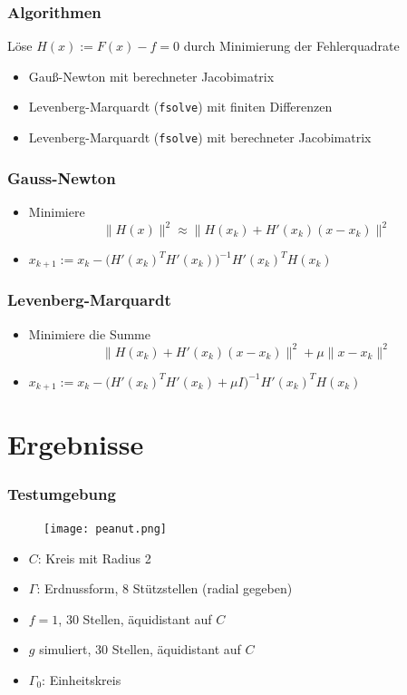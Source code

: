 \documentclass[draft]{beamer}
\begin{document}
\begin{frame}
	\frametitle{Algorithmen}
	Löse $H(x) := F(x) - f = 0$ durch Minimierung der Fehlerquadrate
	\begin{itemize}
		\item
			Gauß-Newton mit berechneter Jacobimatrix
		\item
			Levenberg-Marquardt (\texttt{fsolve}) mit finiten Differenzen
		\item
			Levenberg-Marquardt (\texttt{fsolve}) mit berechneter Jacobimatrix
	\end{itemize}
\end{frame}

\begin{frame}
	\frametitle{Gauss-Newton}
	\begin{itemize}
		\item
			Minimiere
			\[
				\|H(x)\|^2 \approx \|H(x_k) + H'(x_k)(x-x_k)\|^2
			\]
		\item
			$x_{k+1} := x_k - \Big(H'(x_k)^T H'(x_k)\Big)^{-1} H'(x_k)^T H(x_k)$
	\end{itemize}
\end{frame}

\begin{frame}
	\frametitle{Levenberg-Marquardt}
	\begin{itemize}
		\item
			Minimiere die Summe
			\[
				\|H(x_k) + H'(x_k)(x-x_k)\|^2 + \mu \|x-x_k\|^2
			\]
		\item
			$x_{k+1} := x_k - \Big(H'(x_k)^T H'(x_k) + \mu I \Big)^{-1} H'(x_k)^T H(x_k)$
	\end{itemize}
\end{frame}

\section{Ergebnisse}

\begin{frame}
	\frametitle{Testumgebung}
	\begin{minipage}{0.5\textwidth}
		\begin{figure}
			\centering
			\texttt{[image: peanut.png]}
		\end{figure}
	\end{minipage}
	\begin{minipage}{0.48\textwidth}
		\begin{itemize}
			\item \pause
				$C$: Kreis mit Radius 2
			\item
				$\Gamma$: Erdnussform, $8$ Stützstellen (radial gegeben)
			\item
				$f = 1$, $30$ Stellen, äquidistant auf $C$
			\item
				$g$ simuliert, $30$ Stellen, äquidistant auf $C$
			\item
				$\Gamma_0$: Einheitskreis
		\end{itemize}
	\end{minipage}
\end{frame}
\end{document}
